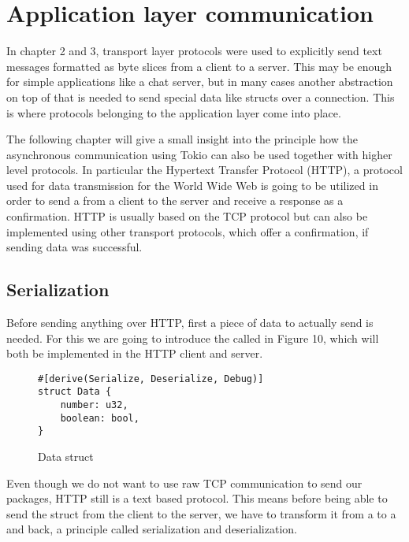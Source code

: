 
\section{Application layer communication}
In chapter 2 and 3, transport layer protocols were used to explicitly send text messages formatted as byte slices from
a client to a server. This may be enough for simple applications like a chat server, but in many cases another
abstraction on top of that is needed to send special data like structs over a connection. This is where protocols
belonging to the application layer come into place.

The following chapter will give a small insight into the principle how the asynchronous communication using Tokio can
also be used together with higher level protocols. In particular the Hypertext Transfer Protocol (HTTP), a protocol
used for data transmission for the World Wide Web is going to be utilized in order to send a  from a
client to the server and receive a response as a confirmation. HTTP is usually based on the TCP protocol but can also
be implemented using other transport protocols, which offer a confirmation, if sending data was successful.

\subsection{Serialization}
Before sending anything over HTTP, first a piece of data to actually send is needed. For this we are going to introduce
the  called  in Figure 10, which will both be implemented in the HTTP client and server.

\begin{figure}[ht]
    \begin{verbatim}
#[derive(Serialize, Deserialize, Debug)]
struct Data {
    number: u32,
    boolean: bool,
}
    \end{verbatim}
    \caption{Data struct}
\end{figure}

Even though we do not want to use raw TCP communication to send our packages, HTTP still is a text based protocol. This
means before being able to send the struct from the client to the server, we have to transform it from a 
to a  and back, a principle called serialization and deserialization.

